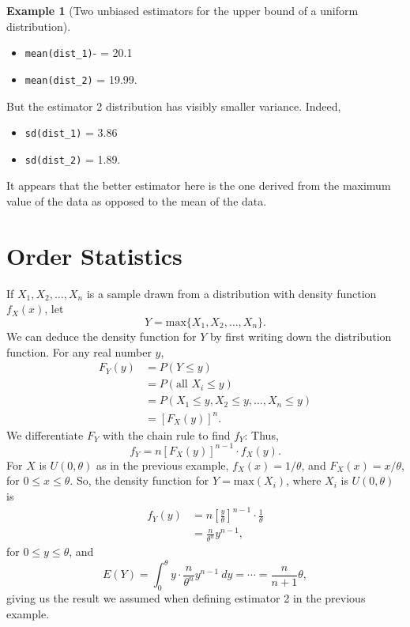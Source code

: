 \documentclass[
]{book}
\providecommand{\tightlist}{%
  \setlength{\itemsep}{0pt}\setlength{\parskip}{0pt}}
\theoremstyle{definition}
\theoremstyle{definition}
\newtheorem{example}{Example}[chapter]
\theoremstyle{definition}
\theoremstyle{definition}
\theoremstyle{remark}
\begin{document}
\begin{example}[Two unbiased estimators for the upper bound of a uniform distribution]
\begin{itemize}
\tightlist
\item
  \texttt{mean(dist\_1)}- = 20.1
\item
  \texttt{mean(dist\_2)} = 19.99.
\end{itemize}

But the estimator 2 distribution has visibly smaller variance. Indeed,

\begin{itemize}
\tightlist
\item
  \texttt{sd(dist\_1)} = 3.86
\item
  \texttt{sd(dist\_2)} = 1.89.
\end{itemize}

It appears that the better estimator here is the one derived from the maximum value of the data as opposed to the mean of the data.
\end{example}

\section{Order Statistics}\label{order-statistics}

If \(X_1, X_2, \ldots, X_n\) is a sample drawn from a distribution with density function \(f_X(x)\), let \[Y = \text{max}\{X_1, X_2, \ldots, X_n\}.\]
We can deduce the density function for \(Y\) by first writing down the distribution function. For any real number \(y\),
\begin{align*}
F_Y(y) &= P(Y \leq y) \\
      &= P(\text{all }X_i \leq y) \\
      &= P(X_1 \leq y, X_2 \leq y, \ldots, X_n \leq y) \\
      &= \left[F_X(y)\right]^n.
\end{align*}
We differentiate \(F_Y\) with the chain rule to find \(f_Y\):
Thus, \[f_Y = n\left[F_X(y)\right]^{n-1}\cdot f_X(y). \tag{density for the max of sample}\]
For \(X\) is \(U(0,\theta)\) as in the previous example, \(f_X(x) = 1/\theta\), and \(F_X(x) = x/\theta\), for \(0 \leq x \leq \theta\). So, the density function for \(Y = \text{max}(X_i)\), where \(X_i\) is \(U(0,\theta)\) is
\begin{align*}
f_Y(y) &= n \left[\frac{y}{\theta}\right]^{n-1} \cdot \frac{1}{\theta}\\
      &= \frac{n}{\theta^n}y^{n-1},
\end{align*}
for \(0 \leq y \leq \theta\),
and \[E(Y) = \int_0^\theta y \cdot \frac{n}{\theta^n}y^{n-1}~dy = \cdots = \frac{n}{n+1}\theta,\]
giving us the result we assumed when defining estimator 2 in the previous example.
\end{document}
